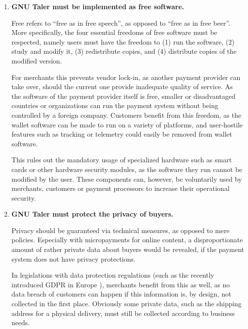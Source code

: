 \begin{enumerate}
  \item \textbf{GNU Taler must be implemented as free software.}

    Free refers to ``free as in free speech'', as opposed to ``free as in free beer''.
    More specifically, the four essential freedoms of free software
    \cite{stallman2002essays} must be respected, namely users must have the
    freedom to (1) run the software, (2) study and modify it, (3) redistribute
    copies, and (4) distribute copies of the modified version.

    For merchants this prevents vendor lock-in, as another payment provider can
    take over, should the current one provide inadequate quality of service.
    As the software of
    the payment provider itself is free, smaller or disadvantaged countries or
    organizations can run the payment system without being controlled by a
    foreign company.  Customers benefit from this freedom, as the wallet
    software can be made to run on a variety of platforms, and user-hostile
    features such as tracking or telemetry could easily be removed from
    wallet software.

    This rules out the mandatory usage of specialized
    hardware such as smart cards or other hardware security modules, as the
    software they run cannot be modified by the user.  These components can,
    however, be voluntarily used by merchants, customers or payment processors
    to increase their operational security.

  \item \textbf{GNU Taler must protect the privacy of buyers.}\label{item:privacy}

    Privacy should be guaranteed via technical measures, as opposed to mere
    policies.  Especially with micropayments for online content, a
    disproportionate amount of rather private data about buyers would be revealed, if
    the payment system does not have privacy protections.

    
    In legislations with data protection regulations (such as the recently introduced GDPR in Europe \cite{voigt2017eu}),
    merchants benefit from this as well, as no data breach of customers can happen if this information
    is, by design, not collected in the first place.  Obviously some private data, such as the shipping
    address for a physical delivery, must still be collected according to business needs.


\end{enumerate}
